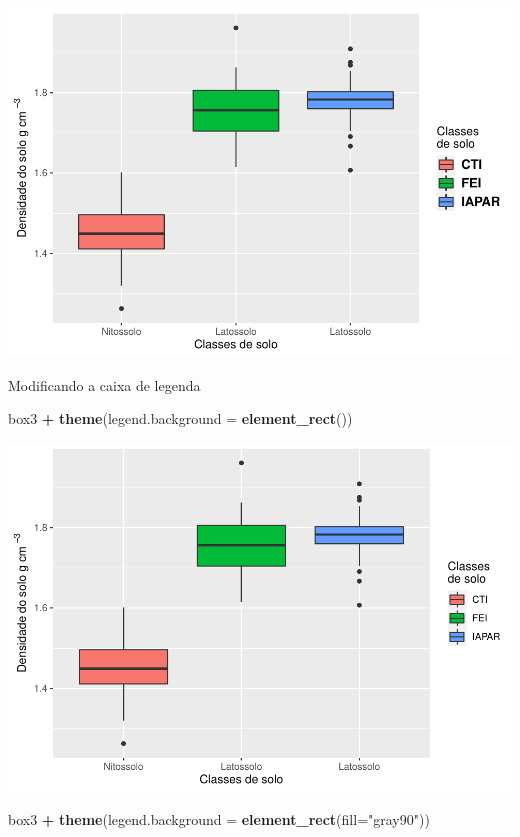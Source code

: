\documentclass[
]{book}
\newenvironment{Shaded}{\begin{snugshade}}{\end{snugshade}}
\newcommand{\DataTypeTok}[1]{\textcolor[rgb]{0.13,0.29,0.53}{#1}}
\newcommand{\KeywordTok}[1]{\textcolor[rgb]{0.13,0.29,0.53}{\textbf{#1}}}
\newcommand{\NormalTok}[1]{#1}
\newcommand{\OperatorTok}[1]{\textcolor[rgb]{0.81,0.36,0.00}{\textbf{#1}}}
\newcommand{\StringTok}[1]{\textcolor[rgb]{0.31,0.60,0.02}{#1}}
\begin{document}
\includegraphics{TudodoR_files/figure-latex/unnamed-chunk-213-2.pdf}

Modificando a caixa de legenda

\begin{Shaded}
\begin{Highlighting}[]
\NormalTok{box3 }\OperatorTok{+}\StringTok{ }\KeywordTok{theme}\NormalTok{(}\DataTypeTok{legend.background =} \KeywordTok{element_rect}\NormalTok{())}
\end{Highlighting}
\end{Shaded}

\includegraphics{TudodoR_files/figure-latex/unnamed-chunk-214-1.pdf}

\begin{Shaded}
\begin{Highlighting}[]
\NormalTok{box3 }\OperatorTok{+}\StringTok{ }\KeywordTok{theme}\NormalTok{(}\DataTypeTok{legend.background =} \KeywordTok{element_rect}\NormalTok{(}\DataTypeTok{fill=}\StringTok{"gray90"}\NormalTok{))}
\end{Highlighting}
\end{Shaded}
\end{document}

